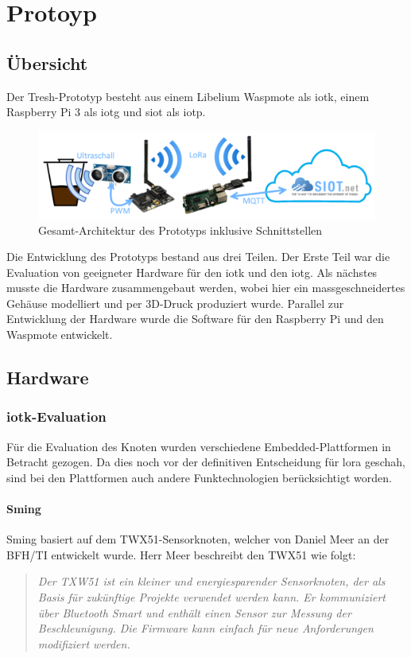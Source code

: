 \chapter{Protoyp}

\section{Übersicht}
Der Tresh-Prototyp besteht aus einem Libelium Waspmote als \gls{iotk}, einem Raspberry Pi 3 als \gls{iotg} und \gls{siot} als \gls{iotp}.

\begin{figure}[H]
     \centering
        \includegraphics[width=1.0\textwidth]{pictures/PrototypeConcept.png}
    \caption{Gesamt-Architektur des Prototyps inklusive Schnittstellen}
    \label{fig:PrototypeConcept}
\end{figure}

Die Entwicklung des Prototyps bestand aus drei Teilen. Der Erste Teil war die Evaluation von geeigneter Hardware für den \gls{iotk} und den \gls{iotg}. Als nächstes musste die Hardware zusammengebaut werden, wobei hier ein massgeschneidertes Gehäuse modelliert und per 3D-Druck produziert wurde. Parallel zur Entwicklung der Hardware wurde die Software für den Raspberry Pi und den Waspmote entwickelt. 

\section{Hardware}

\subsection{\gls{iotk}-Evaluation}
Für die Evaluation des Knoten wurden verschiedene Embedded-Plattformen in Betracht gezogen. Da dies noch vor der definitiven Entscheidung für \gls{lora} geschah, sind bei den Plattformen auch andere Funktechnologien berücksichtigt worden.

\subsubsection*{Sming}
Sming basiert auf dem TWX51-Sensorknoten, welcher von Daniel Meer an der BFH/TI entwickelt wurde. Herr Meer beschreibt den TWX51 wie folgt: 
\begin{quote}
\textit{Der TXW51 ist ein kleiner und energiesparender Sensorknoten, der als Basis für zukünftige Projekte verwendet werden
kann. Er kommuniziert über Bluetooth Smart und enthält einen Sensor zur Messung der Beschleunigung. Die Firmware kann einfach für neue Anforderungen modifiziert werden.}\autocite{bfh:TXW51}
\end{quote}


